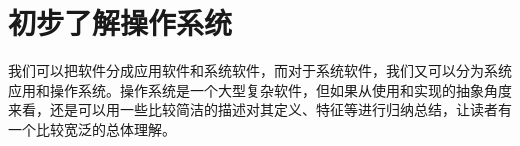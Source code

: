 \section{初步了解操作系统}

我们可以把软件分成应用软件和系统软件，而对于系统软件，我们又可以分为系统应用和操作系统。操作系统是一个大型复杂软件，但如果从使用和实现的抽象角度来看，还是可以用一些比较简洁的描述对其定义、特征等进行归纳总结，让读者有一个比较宽泛的总体理解。





